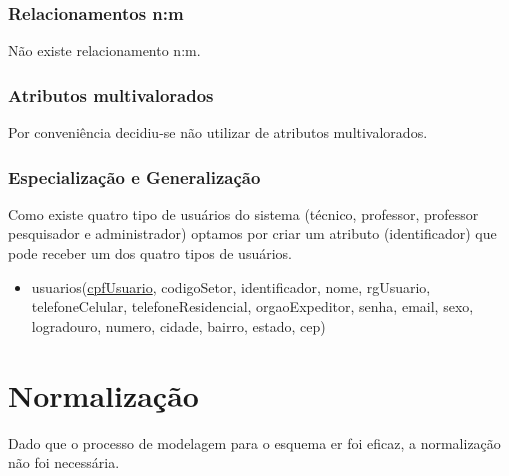 \documentclass[11pt]{article}
\begin{document}
\subsubsection{Relacionamentos n:m}
Não existe relacionamento n:m.

\subsubsection{Atributos multivalorados}

Por conveniência decidiu-se não utilizar de atributos multivalorados.

\subsubsection{Especialização e Generalização}

Como existe quatro tipo de usuários do sistema (técnico, professor, professor pesquisador e administrador) optamos por criar um atributo (identificador) que pode receber um dos quatro tipos de usuários.

\begin{itemize}

\item usuarios(\underline{cpfUsuario}, codigoSetor, identificador, nome, rgUsuario, telefoneCelular, telefoneResidencial, orgaoExpeditor, senha,
email, sexo, logradouro, numero, cidade, bairro, estado, cep)

\end{itemize}

\section{Normalização}
Dado que o processo de modelagem para o esquema er foi eficaz, a normalização não foi necessária.
\end{document}
